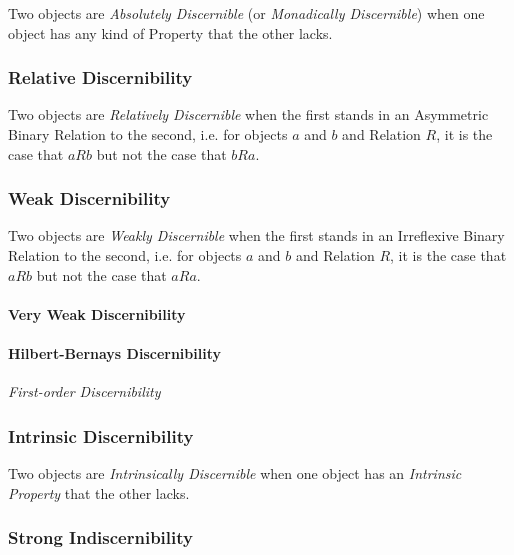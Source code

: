 Two objects are \emph{Absolutely Discernible} (or \emph{Monadically
  Discernible}) when one object has any kind of Property that the
other lacks.



\subsubsection{Relative Discernibility}\label{sec:relative_discernibility}

Two objects are \emph{Relatively Discernible} when the first stands in
an Asymmetric Binary Relation to the second, i.e. for objects $a$ and
$b$ and Relation $R$, it is the case that $aRb$ but not the case that
$bRa$.



\subsubsection{Weak Discernibility}\label{sec:weak_discernibility}

Two objects are \emph{Weakly Discernible} when the first stands in an
Irreflexive Binary Relation to the second, i.e. for objects $a$ and
$b$ and Relation $R$, it is the case that $aRb$ but not the case that
$aRa$.

\paragraph{Very Weak Discernibility}\label{sec:very_weak_discernibility}\hfill

\paragraph{Hilbert-Bernays Discernibility}\hfill
\label{sec:hilbert_bernays_discernibility}

\emph{First-order Discernibility}


\subsubsection{Intrinsic Discernibility}\label{sec:intrinsic_discernibility}


Two objects are \emph{Intrinsically Discernible} when one object has
an \emph{Intrinsic Property} that the other lacks.



\subsubsection{Strong Indiscernibility}\label{sec:strong_indiscernibility}

